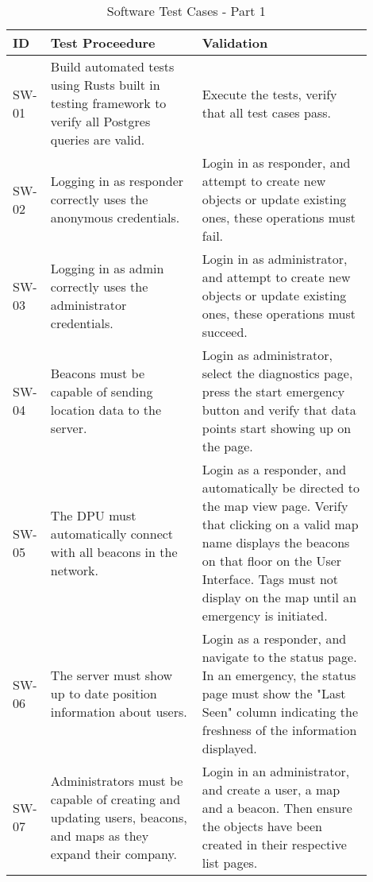 \bigskip
\bgroup
\def\arraystretch{1.25}
\begin{table}[h!]
    \centering
    \begin{tabular}{|p{0.05\linewidth}|p{0.40\linewidth}|p{0.45\linewidth}|}
    \hline
    ID & Test Proceedure & Validation\\

    \hline
    SW-01
    & Build automated tests using Rusts built in testing framework to verify all Postgres queries are valid.
    & Execute the tests, verify that all test cases pass. \\

    \hline
    SW-02
    & Logging in as responder correctly uses the anonymous credentials.
    & Login in as responder, and attempt to create new objects or update existing ones, these operations must fail. \\

    \hline
    SW-03
    & Logging in as admin correctly uses the administrator credentials.
    & Login in as administrator, and attempt to create new objects or update existing ones, these operations must succeed. \\

    \hline
    SW-04
    & Beacons must be capable of sending location data to the server.
    & Login as administrator, select the diagnostics page, press the start emergency button and verify that data points start showing up on the page. \\

    \hline
    SW-05
    & The DPU must automatically connect with all beacons in the network.
    & Login as a responder, and automatically be directed to the map view page. Verify that clicking on a valid map name displays the beacons on that floor on the User Interface. Tags must not display on the map until an emergency is initiated. \\

    \hline
    SW-06
    & The server must show up to date position information about users.
    & Login as a responder, and navigate to the status page. In an emergency, the status page must show the "Last Seen" column indicating the freshness of the information displayed. \\

    \hline
    SW-07
    & Administrators must be capable of creating and updating users, beacons, and maps as they expand their company.
    & Login in an administrator, and create a user, a map and a beacon. Then ensure the objects have been created in their respective list pages. \\

    \hline
    \end{tabular}
    \caption{Software Test Cases - Part 1}
\end{table}

